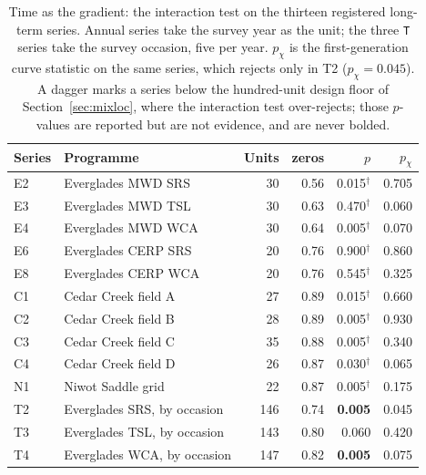 \begin{table}[t]
\centering
\caption{Time as the gradient: the interaction test on the thirteen registered long-term series. Annual series take the survey year as the unit; the three \texttt{T} series take the survey occasion, five per year. $p_\chi$ is the first-generation curve statistic on the same series, which rejects only in T2 ($p_\chi = 0.045$). A dagger marks a series below the hundred-unit design floor of Section~\ref{sec:mixloc}, where the interaction test over-rejects; those $p$-values are reported but are not evidence, and are never bolded.}
\label{tab:temporal}
\small
\begin{tabular}{llrrrr}
\toprule
Series & Programme & Units & zeros & $p$ & $p_\chi$ \\
\midrule
E2 & Everglades MWD SRS & 30 & 0.56 & 0.015$^\dagger$ & 0.705 \\
E3 & Everglades MWD TSL & 30 & 0.63 & 0.470$^\dagger$ & 0.060 \\
E4 & Everglades MWD WCA & 30 & 0.64 & 0.005$^\dagger$ & 0.070 \\
E6 & Everglades CERP SRS & 20 & 0.76 & 0.900$^\dagger$ & 0.860 \\
E8 & Everglades CERP WCA & 20 & 0.76 & 0.545$^\dagger$ & 0.325 \\
C1 & Cedar Creek field A & 27 & 0.89 & 0.015$^\dagger$ & 0.660 \\
C2 & Cedar Creek field B & 28 & 0.89 & 0.005$^\dagger$ & 0.930 \\
C3 & Cedar Creek field C & 35 & 0.88 & 0.005$^\dagger$ & 0.340 \\
C4 & Cedar Creek field D & 26 & 0.87 & 0.030$^\dagger$ & 0.065 \\
N1 & Niwot Saddle grid & 22 & 0.87 & 0.005$^\dagger$ & 0.175 \\
T2 & Everglades SRS, by occasion & 146 & 0.74 & \textbf{0.005} & 0.045 \\
T3 & Everglades TSL, by occasion & 143 & 0.80 & 0.060 & 0.420 \\
T4 & Everglades WCA, by occasion & 147 & 0.82 & \textbf{0.005} & 0.075 \\
\bottomrule
\end{tabular}
\end{table}
